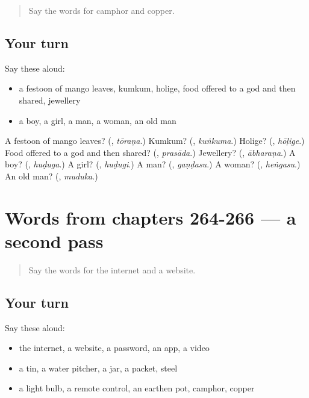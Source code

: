 \label{lesson:KA-R266-first-pass-words-from-chapters-262-263}



\begin{quote}
Say the words for camphor and copper.
\end{quote}

\subsection*{Your turn}
Say these aloud:

\begin{itemize}
\raggedright
  \item a festoon of mango leaves, kumkum, holige, food offered to a god and then shared, jewellery
  \item a boy, a girl, a man, a woman, an old man
\end{itemize}

\begin{tcolorbox}[breakable,colback=teal!4,colframe=teal!35!black,title={Before you move on}]
A festoon of mango leaves? (\textbf{}, \emph{tōraṇa}.) Kumkum? (\textbf{}, \emph{kuṅkuma}.) Holige? (\textbf{}, \emph{hōḷige}.) Food offered to a god and then shared? (\textbf{}, \emph{prasāda}.) Jewellery? (\textbf{}, \emph{ābharaṇa}.) A boy? (\textbf{}, \emph{huḍuga}.) A girl? (\textbf{}, \emph{huḍugi}.) A man? (\textbf{}, \emph{gaṇḍasu}.) A woman? (\textbf{}, \emph{heṅgasu}.) An old man? (\textbf{}, \emph{muduka}.)
\end{tcolorbox}
\section[(dialogue)]{Words from chapters 264-266 — a second pass}

\label{lesson:KA-R266-second-pass-words-from-chapters-264-266}



\begin{quote}
Say the words for the internet and a website.
\end{quote}

\subsection*{Your turn}
Say these aloud:

\begin{itemize}
\raggedright
  \item the internet, a website, a password, an app, a video
  \item a tin, a water pitcher, a jar, a packet, steel
  \item a light bulb, a remote control, an earthen pot, camphor, copper
\end{itemize}

